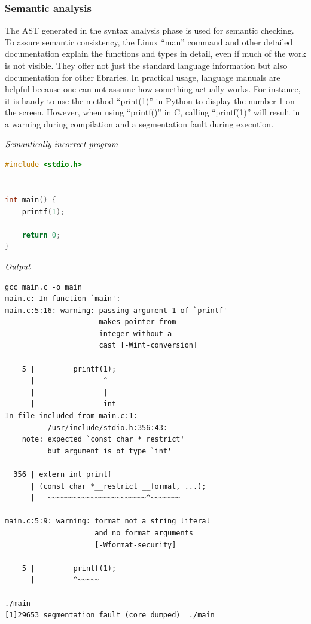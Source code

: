 \documentclass[journal]{IEEEtran}
\begin{document}
\subsubsection{Semantic analysis}
The AST generated in the syntax analysis phase is used for semantic checking. To assure semantic consistency, the Linux ``man'' command and other detailed documentation explain the functions and types in detail, even if much of the work is not visible. They offer not just the standard language information but also documentation for other libraries. In practical usage, language manuals are helpful because one can not assume how something actually works. For instance, it is handy to use the method ``print(1)'' in Python to display the number 1 on the screen. However, when using ``printf()'' in C, calling ``printf(1)'' will result in a warning during compilation and a segmentation fault during execution. 

$\\\textit{Semantically incorrect program}$

\begin{lstlisting}[language=C, breaklines=true, basicstyle=\footnotesize, frame=single]
#include <stdio.h>


int main() {
	printf(1);

	return 0;
}

\end{lstlisting}

$\\\textit{Output}$

\begin{lstlisting}[breaklines=true, basicstyle=\footnotesize, frame=single]
gcc main.c -o main
main.c: In function `main':
main.c:5:16: warning: passing argument 1 of `printf' 
                      makes pointer from 
                      integer without a 
                      cast [-Wint-conversion]
                      
    5 |         printf(1);
      |                ^
      |                |
      |                int
In file included from main.c:1:
          /usr/include/stdio.h:356:43: 
    note: expected `const char * restrict' 
          but argument is of type `int'
          
  356 | extern int printf 
      | (const char *__restrict __format, ...);
      |   ~~~~~~~~~~~~~~~~~~~~~~~^~~~~~~~
      
main.c:5:9: warning: format not a string literal 
                     and no format arguments 
                     [-Wformat-security]
                     
    5 |         printf(1);
      |         ^~~~~~

./main                                                     
[1]29653 segmentation fault (core dumped)  ./main
\end{lstlisting}
\end{document}
